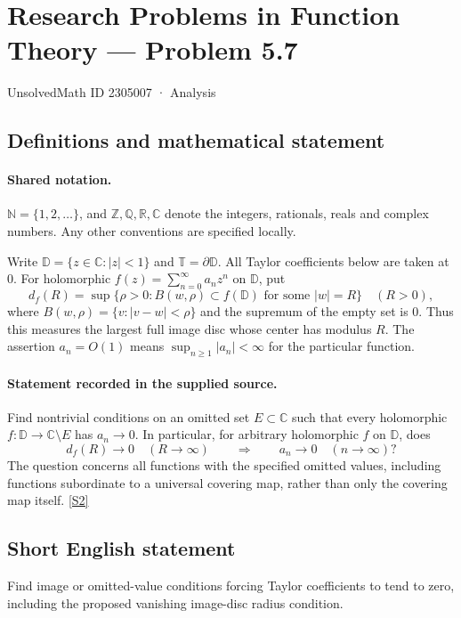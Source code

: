 \documentclass[11pt]{article}
\newcommand{\sref}[2]{\hyperlink{source:#1:#2}{[S#2]}}
\begin{document}
\setcounter{section}{2305006}
\section{Research Problems in Function Theory — Problem 5.7}\label{2305007}
{\small\sffamily UnsolvedMath ID 2305007 · Analysis}
\subsection{Definitions and mathematical statement}

\paragraph{Shared notation.}$\mathbb N=\{1,2,\ldots\}$, and $\mathbb Z,\mathbb Q,\mathbb R,\mathbb C$ denote the integers, rationals, reals and complex numbers. Any other conventions are specified locally.


Write $\mathbb D=\{z\in\mathbb C:|z|<1\}$ and $\mathbb T=\partial\mathbb D$. All Taylor coefficients below are taken at $0$. For holomorphic $f(z)=\sum_{n=0}^\infty a_nz^n$ on $\mathbb D$, put
\[d_f(R)=\sup\{\rho>0:B(w,\rho)\subset f(\mathbb D)\text{ for some }|w|=R\}\quad(R>0),\]
where $B(w,\rho)=\{v:|v-w|<\rho\}$ and the supremum of the empty set is $0$. Thus this measures the largest full image disc whose center has modulus $R$. The assertion $a_n=O(1)$ means $\sup_{n\ge1}|a_n|<\infty$ for the particular function.
\paragraph{Statement recorded in the supplied source.}
Find nontrivial conditions on an omitted set $E\subset\mathbb C$ such that every holomorphic $f:\mathbb D\to\mathbb C\setminus E$ has $a_n\to0$. In particular, for arbitrary holomorphic $f$ on $\mathbb D$, does
\[d_f(R)\longrightarrow0\quad(R\to\infty)\qquad\Longrightarrow\qquad a_n\longrightarrow0\quad(n\to\infty)?\]
The question concerns all functions with the specified omitted values, including functions subordinate to a universal covering map, rather than only the covering map itself. \sref{2305007}{2}
\subsection{Short English statement}
Find image or omitted-value conditions forcing Taylor coefficients to tend to zero, including the proposed vanishing image-disc radius condition.
\end{document}
